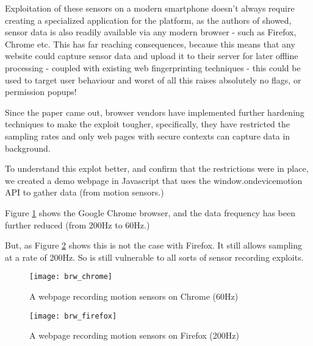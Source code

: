 Exploitation of these sensors on a modern smartphone doesn't always require creating a specialized application for the platform, as the authors of \cite{touchsig} showed, sensor data is also readily available via any modern browser - such as Firefox, Chrome etc. This has far reaching consequences, because this means that any website could capture sensor data and upload it to their server for later offline processing - coupled with existing web fingerprinting techniques - this could be used to target user behaviour and worst of all this raises absolutely no flags, or permission popups!

Since the paper came out, browser vendors have implemented further hardening techniques to make the exploit tougher, specifically, they have restricted the sampling rates and only web pages with secure contexts can capture data in background.

To understand this explot better, and confirm that the restrictions were in place, we created a demo webpage in Javascript that uses the window.ondevicemotion API to gather data (from motion sensors.)

Figure \ref{fig:brw_chrome} shows the Google Chrome browser, and the data frequency has been further reduced (from 200Hz to 60Hz.)

But, as Figure \ref{fig:brw_firefox} shows this is not the case with Firefox. It still allows sampling at a rate of 200Hz. So is still vulnerable to all sorts of sensor recording exploits.

\begin{figure}[H] \begin{center}
\texttt{[image: brw\_chrome]}
\caption{A webpage recording motion sensors on Chrome (60Hz)}
\label{fig:brw_chrome}
\end{center} \end{figure}

\begin{figure}[H] \begin{center}
\texttt{[image: brw\_firefox]}
\caption{A webpage recording motion sensors on Firefox (200Hz)}
\label{fig:brw_firefox}
\end{center} \end{figure}
